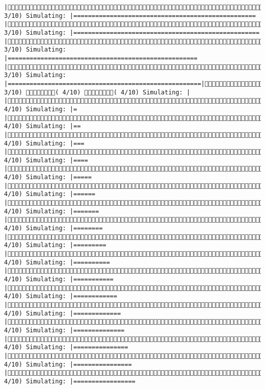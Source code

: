 \documentclass[]{article}
\begin{document}
\begin{verbatim}
|( 3/10) Simulating: |==================================================   |( 3/10) Simulating: |===================================================  |( 3/10) Simulating: |==================================================== |( 3/10) Simulating: |=====================================================|( 3/10) ( 4/10) ( 4/10) Simulating: |                                                     |( 4/10) Simulating: |=                                                    |( 4/10) Simulating: |==                                                   |( 4/10) Simulating: |===                                                  |( 4/10) Simulating: |====                                                 |( 4/10) Simulating: |=====                                                |( 4/10) Simulating: |======                                               |( 4/10) Simulating: |=======                                              |( 4/10) Simulating: |========                                             |( 4/10) Simulating: |=========                                            |( 4/10) Simulating: |==========                                           |( 4/10) Simulating: |===========                                          |( 4/10) Simulating: |============                                         |( 4/10) Simulating: |=============                                        |( 4/10) Simulating: |==============                                       |( 4/10) Simulating: |===============                                      |( 4/10) Simulating: |================                                     |( 4/10) Simulating: |=================                       
\end{verbatim}
\end{document}
